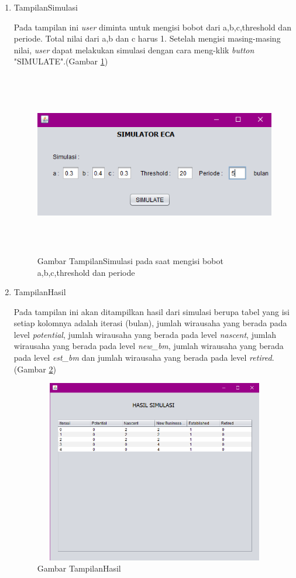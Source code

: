 \begin{enumerate}
	\item TampilanSimulasi
	
	Pada tampilan ini \textit{user} diminta untuk mengisi bobot dari a,b,c,threshold dan periode. Total nilai dari a,b dan c harus 1. Setelah mengisi masing-masing nilai, \textit{user} dapat melakukan simulasi dengan cara meng-klik \textit{button} "SIMULATE".(Gambar \ref{fig:tampilansimulasi})
	
		\begin{figure} [H]
	\centering  
	\includegraphics[width=14cm, height=8cm]{tampilanImplementasiSimulasi1} 
		\caption[Gambar TampilanSimulasi]{Gambar TampilanSimulasi pada saat mengisi bobot a,b,c,threshold dan periode}
	\label{fig:tampilansimulasi} 
\end{figure}

	\item TampilanHasil
	
	Pada tampilan ini akan ditampilkan hasil dari simulasi berupa tabel yang isi setiap kolomnya adalah iterasi (bulan), jumlah wirausaha yang berada pada level \textit{potential}, jumlah wirausaha yang berada pada level \textit{nascent}, jumlah wirausaha yang berada pada level \textit{new\_bm}, jumlah wirausaha yang berada pada level \textit{est\_bm} dan jumlah wirausaha yang berada pada level \textit{retired}. (Gambar \ref{fig:tampilanHasil})
	
	\begin{figure} [H]
	\centering  
	\includegraphics[width=14cm, height=8cm]{hasil2} 
		\caption[Gambar TampilanHasil]{Gambar TampilanHasil}
	\label{fig:tampilanHasil} 
\end{figure}

\end{enumerate}

